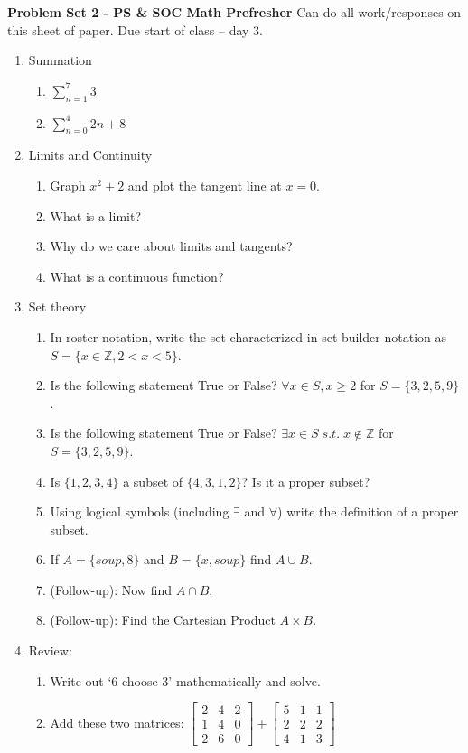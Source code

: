\documentclass[11pt]{article}
\begin{document}
\noindent \textbf{Problem Set 2 - PS \& SOC Math Prefresher }
Can do all work/responses on this sheet of paper. Due start of class -- day 3. 

\begin{enumerate}
\item Summation
\begin{enumerate}
\item $\sum_{n=1}^{7}3$
\item $\sum_{n=0}^{4} 2n+8$
\end{enumerate}

\item Limits and Continuity
\begin{enumerate}
\item Graph $x^2+2$ and plot the tangent line at $x=0$. 
\item What is a limit?
\item Why do we care about limits and tangents?
\item What is a continuous function?
\end{enumerate}

\item Set theory
\begin{enumerate}
\item In roster notation, write the set characterized in set-builder notation as $S = \{x \in \mathbb{Z}, 2 <x <5\}$.
\item Is the following statement True or False? $\forall x \in S, x\geq 2$ for $S = \{3,2,5,9\}$.
\item Is the following statement True or False? $\exists x \in S\; s.t. \; x \notin \mathbb{Z}$ for $S = \{3,2,5,9\}$.
\item Is $\{1,2,3,4\}$ a subset of $\{4,3,1,2\}$? Is it a proper subset?
\item Using logical symbols (including $\exists$ and $\forall$) write the definition of a proper subset.
\item If $A = \{soup, 8\}$ and $B = \{x, soup\}$ find $A \cup B$.
\item (Follow-up): Now find $A \cap B$.
\item (Follow-up): Find the Cartesian Product $A \times B$.
\end{enumerate}

\item Review:
\begin{enumerate}
\item Write out `6 choose 3' mathematically and solve.
\item Add these two matrices: $
\begin{bmatrix}
   2 & 4 & 2 \\
    1 & 4 & 0 \\
    2 & 6 & 0
\end{bmatrix}
+
\begin{bmatrix}
5 & 1 & 1 \\
2 & 2 & 2\\
4 & 1 & 3
\end{bmatrix}
$


\end{enumerate}
\end{enumerate}
\end{document}
